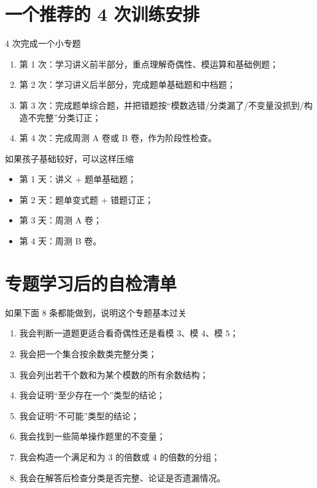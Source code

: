 \documentclass[11pt,a4paper,fontset=fandol]{ctexart}
\begin{document}
\section{一个推荐的 4 次训练安排}

\begin{goalbox}{4 次完成一个小专题}
\begin{enumerate}
  \item 第 1 次：学习讲义前半部分，重点理解奇偶性、模运算和基础例题；
  \item 第 2 次：学习讲义后半部分，完成题单基础题和中档题；
  \item 第 3 次：完成题单综合题，并把错题按“模数选错/分类漏了/不变量没抓到/构造不完整”分类订正；
  \item 第 4 次：完成周测 A 卷或 B 卷，作为阶段性检查。
\end{enumerate}
\end{goalbox}

\begin{infobox}{如果孩子基础较好，可以这样压缩}
\begin{itemize}
  \item 第 1 天：讲义 + 题单基础题；
  \item 第 2 天：题单变式题 + 错题订正；
  \item 第 3 天：周测 A 卷；
  \item 第 4 天：周测 B 卷。
\end{itemize}
\end{infobox}

\section{专题学习后的自检清单}

\begin{goalbox}{如果下面 8 条都能做到，说明这个专题基本过关}
\begin{enumerate}
  \item 我会判断一道题更适合看奇偶性还是看模 $3$、模 $4$、模 $5$；
  \item 我会把一个集合按余数类完整分类；
  \item 我会列出若干个数和为某个模数的所有余数结构；
  \item 我会证明“至少存在一个”类型的结论；
  \item 我会证明“不可能”类型的结论；
  \item 我会找到一些简单操作题里的不变量；
  \item 我会构造一个满足和为 $3$ 的倍数或 $4$ 的倍数的分组；
  \item 我会在解答后检查分类是否完整、论证是否遗漏情况。
\end{enumerate}
\end{goalbox}
\end{document}
